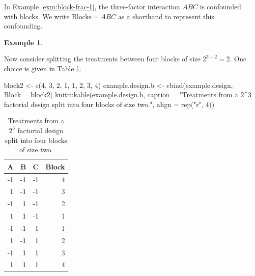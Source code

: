 \documentclass[
]{book}
\newenvironment{Shaded}{\begin{snugshade}}{\end{snugshade}}
\newcommand{\AttributeTok}[1]{\textcolor[rgb]{0.77,0.63,0.00}{#1}}
\newcommand{\DecValTok}[1]{\textcolor[rgb]{0.00,0.00,0.81}{#1}}
\newcommand{\FunctionTok}[1]{\textcolor[rgb]{0.00,0.00,0.00}{#1}}
\newcommand{\NormalTok}[1]{#1}
\newcommand{\OtherTok}[1]{\textcolor[rgb]{0.56,0.35,0.01}{#1}}
\newcommand{\SpecialCharTok}[1]{\textcolor[rgb]{0.00,0.00,0.00}{#1}}
\newcommand{\StringTok}[1]{\textcolor[rgb]{0.31,0.60,0.02}{#1}}
\theoremstyle{definition}
\theoremstyle{definition}
\newtheorem{example}{Example}[chapter]
\theoremstyle{definition}
\theoremstyle{definition}
\theoremstyle{remark}
\begin{document}
In Example \ref{exm:block-frac-1}, the three-factor interaction \(ABC\) is confounded with blocks. We write \(\mathrm{Blocks} = ABC\) as a shorthand to represent this confounding.

\begin{example}
\protect\hypertarget{exm:block-frac-2}{}\label{exm:block-frac-2}

Now consider splitting the treatments between four blocks of size \(2^{3-2}=2\). One choice is given in Table \ref{tab:block-frac-2}.

\begin{Shaded}
\begin{Highlighting}[]
\NormalTok{block2 }\OtherTok{\textless{}{-}} \FunctionTok{c}\NormalTok{(}\DecValTok{4}\NormalTok{, }\DecValTok{3}\NormalTok{, }\DecValTok{2}\NormalTok{, }\DecValTok{1}\NormalTok{, }\DecValTok{1}\NormalTok{, }\DecValTok{2}\NormalTok{, }\DecValTok{3}\NormalTok{, }\DecValTok{4}\NormalTok{)}
\NormalTok{example.design.b }\OtherTok{\textless{}{-}} \FunctionTok{cbind}\NormalTok{(example.design, }\AttributeTok{Block =}\NormalTok{ block2)}
\NormalTok{knitr}\SpecialCharTok{::}\FunctionTok{kable}\NormalTok{(example.design.b, }\AttributeTok{caption =} \StringTok{"Treatments from a $2\^{}3$ factorial design split into four blocks of size two."}\NormalTok{, }\AttributeTok{align =} \FunctionTok{rep}\NormalTok{(}\StringTok{"r"}\NormalTok{, }\DecValTok{4}\NormalTok{))}
\end{Highlighting}
\end{Shaded}

\begin{table}

\caption{\label{tab:block-frac-2}Treatments from a $2^3$ factorial design split into four blocks of size two.}
\centering
\begin{tabular}[t]{r|r|r|r}
\hline
A & B & C & Block\\
\hline
-1 & -1 & -1 & 4\\
\hline
1 & -1 & -1 & 3\\
\hline
-1 & 1 & -1 & 2\\
\hline
1 & 1 & -1 & 1\\
\hline
-1 & -1 & 1 & 1\\
\hline
1 & -1 & 1 & 2\\
\hline
-1 & 1 & 1 & 3\\
\hline
1 & 1 & 1 & 4\\
\hline
\end{tabular}
\end{table}


\end{example}
\end{document}

